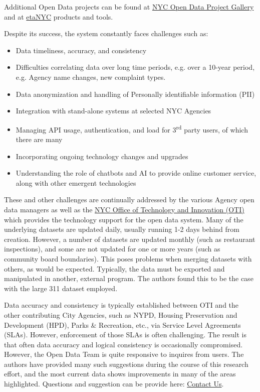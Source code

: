 \documentclass[12pt, titlepage]{article}
\begin{document}
Additional Open Data projects can be found 
at \href{https://opendata.cityofnewyork.us/projects/}{NYC Open Data Project Gallery}
and at \href{https://beta.nyc/beta/products/}{\textbeta etaNYC} products and tools.

Despite its success, the system constantly faces challenges such as:

\begin{itemize}
	\item Data timeliness, accuracy, and consistency
	\item Difficulties correlating data over long time periods, e.g. over a 10-year 
	period, e.g. Agency name changes, new complaint types.
	\item Data anonymization and handling of Personally identifiable information (PII)
	\item Integration with stand-alone systems at selected NYC Agencies
	\item Managing API usage, authentication, and load for 3\textsuperscript{rd} 
	party users, of which there are many
	\item Incorporating ongoing technology changes and upgrades 
	\item Understanding the role of chatbots and AI to provide online 
	customer service, along with other emergent technologies
\end{itemize}

These and other challenges are continually addressed by the various Agency open data managers
as well as the 
\href{https://www.nyc.gov/content/oti/pages/}{NYC Office of Technology and Innovation (OTI)} 
which provides the technology support for the open data system.  
Many of the underlying datasets are updated daily, usually running 
1-2 days behind from creation. However, a number of datasets 
are updated monthly (such as restaurant inspections), and some are 
not updated for one or more years (such as community board 
boundaries). This poses problems when merging datasets with 
others, as would be expected. Typically, the data must be exported 
and manipulated in another, external program. The authors found 
this to be the case with the large 311 dataset employed.

Data accuracy and consistency is typically established between OTI 
and the other contributing City Agencies, such as NYPD, Housing 
Preservation and Development (HPD), Parks \& Recreation, etc., via 
Service Level Agreements (SLAs). However, enforcement of those 
SLAs is often challenging. The result is that often data accuracy and 
logical consistency is occasionally compromised. However, 
the Open Data Team is quite responsive to inquires from users. The 
authors have provided many such suggestions during the course of this research effort, 
and the most current data shows improvements in many of the areas highlighted. 
Questions and suggestion  can be provide here: 
\href{https://opendata.cityofnewyork.us/engage/}{Contact Us}.
\end{document}
